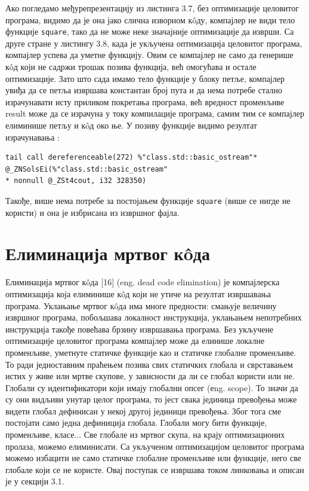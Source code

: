 \documentclass[12pt,oneside]{memoir}
\begin{document}
Ако погледамо међурепрезентацију из листинга 3.7, без оптимизације целовитог програма, видимо да је она јако
слична изворном к\^{o}ду, компајлер не види тело функције \texttt{square}, тако да не може неке 
значајније оптимизације да изврши.
Са друге стране у листингу 3.8, када је укључена оптимизација целовитог програма, компајлер
успева да уметне функцију.
Овим се компајлер не само да генерише  к\^{o}д који не садржи трошак позива функција, већ омогућава и остале оптимизације.
Зато што сада имамо тело функције у блоку петље, компајлер увиђа да се петља извршава константан
број пута и да нема потребе стално израчунавати исту приликом покретања програма, већ вредност
променљиве result може да се израчуна у току компилације програма, самим тим се компајлер елиминише петљу и к\^{o}д око ње.
У позиву  функције видимо резултат израчунавања :
\begin{lstlisting}[frame=single]
tail call dereferenceable(272) %"class.std::basic_ostream"*
@_ZNSolsEi(%"class.std::basic_ostream"
* nonnull @_ZSt4cout, i32 328350)
\end{lstlisting}
Такође, више нема потребе за постојањем функције \texttt{square} (више се нигде не користи)
и она је избрисана из извршног фајла.



\section{Елиминација мртвог к\^{o}да}

Елиминација мртвог к\^{o}да [16] (eng. dead code elimination) је компајлерска 
оптимизација која елиминише к\^{o}д који не утиче на резултат извршавања
програма.
Уклањање мртвог к\^{o}да има многе предности: смањује величину извршног програма,
побољшава локалност инструкција, уклањањем непотребних инструкција такође
повећава брзину извршавања програма.
Без укључене оптимизације целовитог програма компајлер може да елинише локалне
променљиве, уметнуте статичке функције као и статичке глобалне променљиве.
То ради једноставним праћењем позива свих статичких глобала и сврставањем истих
у живе или мртве скупове, у зависности да ли се глобал користи или не.
Глобали су идентификатори који имају глобални опсег (еng. scope).
То значи да су они видљиви унутар целог програма, то јест свака јединица превођења
може видети глобал дефинисан у некој другој јединици превођења.
Због тога сме постојати само једна дефиниција глобала.
Глобали могу бити функције, променљиве, класе...
Све глобале из мртвог скупа, на крају оптимизационих пролаза, можемо елиминисати.
Са укљученом оптимизацијом целовитог програма можемо избацити не само статичке
глобалне променљиве или функције, него све глобале који се не користе.
Овај поступак се извршава током линковања и описан је у секцији  3.1.
\end{document}

